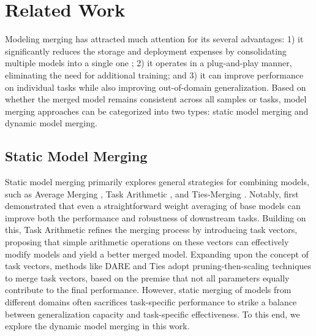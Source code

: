 \section{Related Work}
Modeling merging \citep{merge_survey, mergeKit} has attracted much attention for its several advantages: 1) it significantly reduces the storage and deployment expenses by consolidating multiple models into a single one \citep{task_arithmetic,widen}; 2) it operates in a plug-and-play manner, eliminating the need for additional training\citep{model_soup,dare}; and 3) it can improve performance on individual tasks\citep{model_soup,task_arithmetic,ties_merging} while also improving out-of-domain generalization\citep{cha_2021_swad,reg_mean}.
Based on whether the merged model remains consistent across all samples or tasks, model merging approaches can be categorized into two types: static model merging and dynamic model merging.

\subsection{Static Model Merging}
Static model merging primarily explores general strategies for combining models, such as Average Merging \citep{model_soup}, Task Arithmetic \citep{task_arithmetic}, and Ties-Merging \citep{ties_merging}. Notably, \citet{model_soup} first demonstrated that even a straightforward weight averaging of base models can improve both the performance and robustness of downstream tasks.
Building on this, Task Arithmetic \citep{task_arithmetic} refines the merging process by introducing task vectors, proposing that simple arithmetic operations on these vectors can effectively modify models and yield a better merged model. Expanding upon the concept of task vectors, methods like DARE \citep{dare} and Ties \citep{ties_merging} adopt pruning-then-scaling techniques to merge task vectors, based on the premise that not all parameters equally contribute to the final performance. 
However, static merging of models from different domains often sacrifices task-specific performance to strike a balance between generalization capacity and task-specific effectiveness. To this end, we explore the dynamic model merging in this work.

